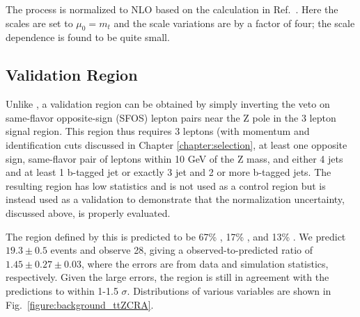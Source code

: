 The \tZ process is normalized to NLO based on the calculation in Ref.~\cite{Campbell:2013yla}.  Here the scales are set to $\mu_0 = m_t$ and the scale variations are by a factor of four; the scale dependence is found to be quite small.


\subsection{\ttZ Validation Region}

Unlike \ttW, a \ttZ validation region can be obtained by simply inverting the veto on same-flavor opposite-sign (SFOS) lepton pairs near the Z pole in the 3 lepton signal region. This region thus requires 3 leptons (with momentum and identification cuts discussed in Chapter \ref{chapter:selection}, at least one opposite sign, same-flavor pair of leptons within 10 GeV of the Z mass, and either 4 jets and at least 1 b-tagged jet or exactly 3 jet and 2 or more b-tagged jets. The resulting region has low statistics and is not used as a control region but is instead used as a validation to demonstrate that the normalization uncertainty, discussed above, is properly evaluated. 

The region defined by this is predicted to be 67\% \ttZ, 17\% \WZ, and 13\% \tZ.  We predict $19.3 \pm 0.5$ events and observe 28, giving a observed-to-predicted ratio of $1.45 \pm 0.27 \pm 0.03$, where the errors are from data and simulation statistics, respectively. Given the large errors, the region is still in agreement with the predictions to within 1-1.5 $\sigma$.  Distributions of various variables are shown in Fig.~\ref{figure:background_ttZCRA}.  

